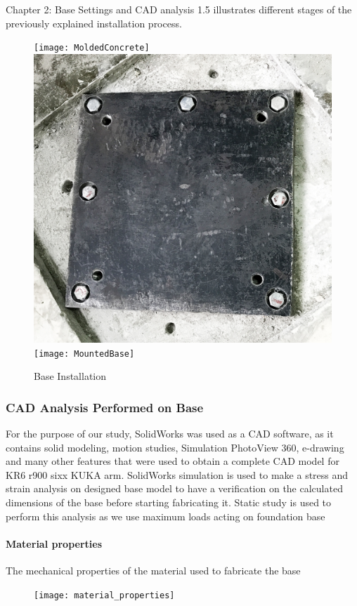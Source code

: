 \documentclass{book}
\begin{document}
\begin{chapter}{Chapter 2: Base Settings and CAD analysis}
\figurename{1.5} illustrates different stages of the previously explained installation process.

\begin{figure}[H]
\begin{center}
\texttt{[image: MoldedConcrete]}	
\includegraphics[scale=0.08]{FirstFlange}
\texttt{[image: MountedBase]}
\caption{Base Installation}
\end{center}
\end{figure}



\newpage
\subsubsection{CAD Analysis Performed on Base}
For the purpose of our study, SolidWorks was used as a CAD software, as it contains solid modeling, motion studies, Simulation PhotoView 360, e-drawing and many other features that were used to obtain a complete CAD model for KR6 r900 sixx KUKA arm. 
\newline SolidWorks simulation is used to make a stress and strain analysis on designed base model to have a verification on the calculated dimensions of the base before starting fabricating it. Static study is used to perform this analysis as we use maximum loads acting on foundation base 

\paragraph{Material properties}
The mechanical properties of the material used to fabricate the base
\begin{figure}[H]
	\centering
	\texttt{[image: material\_properties]}
\end{figure}



\end{chapter}
\end{document}
